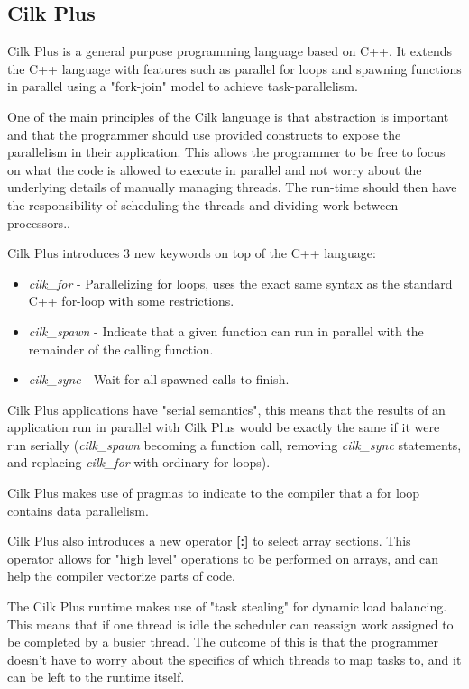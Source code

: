 \subsection{Cilk Plus}

Cilk Plus is a general purpose programming language based on C++. It extends the C++ language with features such as
parallel for loops and spawning functions in parallel using a "fork-join" model to achieve task-parallelism.

One of the main principles of the Cilk language is that abstraction is important and that the programmer should use provided constructs to expose 
the parallelism in their application. This allows the programmer to be free to focus on what the code is allowed to execute in parallel and not worry about the underlying details of manually managing threads. The run-time should then have the responsibility of scheduling the threads and dividing work between
processors.\cite{cilkfaq}. 

Cilk Plus introduces 3 new keywords on top of the C++ language\cite{cilk}: 
\begin{itemize}
    \item \textit{cilk\_for} - Parallelizing for loops, uses the exact same syntax as the standard C++ for-loop
                             with some restrictions.
    \item \textit{cilk\_spawn} - Indicate that a given function can run in parallel with the remainder
                              of the calling function. 
    \item \textit{cilk\_sync} - Wait for all spawned calls to finish.
\end{itemize}

Cilk Plus applications have "serial semantics"\cite{cilk}, this means that the results of an application run
in parallel with Cilk Plus would be exactly the same if it were run
serially (\textit{cilk\_spawn} becoming a function call, removing \textit{cilk\_sync} statements, 
and replacing \textit{cilk\_for} with ordinary for loops).

Cilk Plus makes use of pragmas to indicate to the compiler that a for loop contains data parallelism.\cite{cilkfaq}

Cilk Plus also introduces a new operator \textbf{[:]} to select array sections\cite{cilkarray}. This operator
allows for "high level" operations to be performed on arrays, and can help the compiler vectorize parts of code.

The Cilk Plus runtime makes use of "task stealing" for dynamic load balancing\cite{cilkfaq}. This 
means that if one thread is idle the scheduler can reassign work assigned to be completed by a busier thread. 
The outcome of this is that the programmer doesn't have to worry about the specifics of which threads
to map tasks to, and it can be left to the runtime itself.


